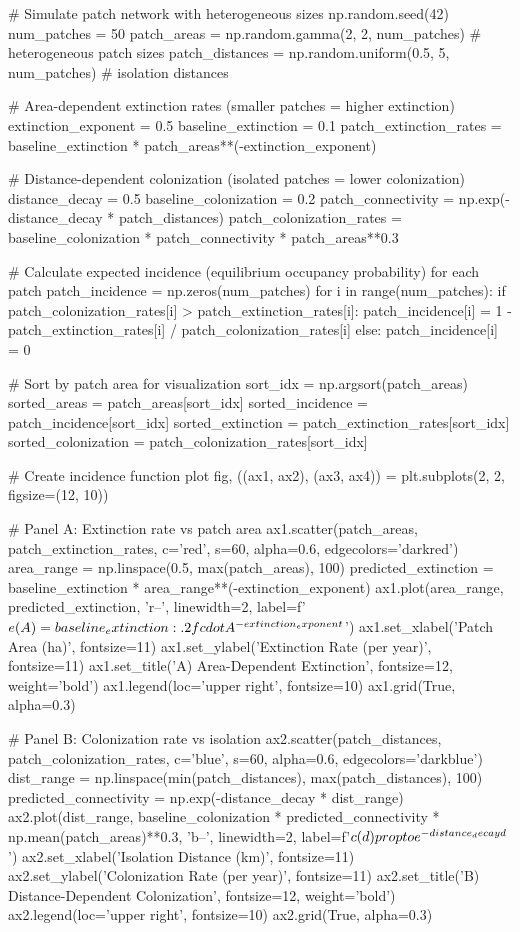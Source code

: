 \documentclass[11pt,a4paper]{article}
\begin{document}
\begin{pycode}
# Simulate patch network with heterogeneous sizes
np.random.seed(42)
num_patches = 50
patch_areas = np.random.gamma(2, 2, num_patches)  # heterogeneous patch sizes
patch_distances = np.random.uniform(0.5, 5, num_patches)  # isolation distances

# Area-dependent extinction rates (smaller patches = higher extinction)
extinction_exponent = 0.5
baseline_extinction = 0.1
patch_extinction_rates = baseline_extinction * patch_areas**(-extinction_exponent)

# Distance-dependent colonization (isolated patches = lower colonization)
distance_decay = 0.5
baseline_colonization = 0.2
patch_connectivity = np.exp(-distance_decay * patch_distances)
patch_colonization_rates = baseline_colonization * patch_connectivity * patch_areas**0.3

# Calculate expected incidence (equilibrium occupancy probability) for each patch
patch_incidence = np.zeros(num_patches)
for i in range(num_patches):
    if patch_colonization_rates[i] > patch_extinction_rates[i]:
        patch_incidence[i] = 1 - patch_extinction_rates[i] / patch_colonization_rates[i]
    else:
        patch_incidence[i] = 0

# Sort by patch area for visualization
sort_idx = np.argsort(patch_areas)
sorted_areas = patch_areas[sort_idx]
sorted_incidence = patch_incidence[sort_idx]
sorted_extinction = patch_extinction_rates[sort_idx]
sorted_colonization = patch_colonization_rates[sort_idx]

# Create incidence function plot
fig, ((ax1, ax2), (ax3, ax4)) = plt.subplots(2, 2, figsize=(12, 10))

# Panel A: Extinction rate vs patch area
ax1.scatter(patch_areas, patch_extinction_rates, c='red', s=60, alpha=0.6, edgecolors='darkred')
area_range = np.linspace(0.5, max(patch_areas), 100)
predicted_extinction = baseline_extinction * area_range**(-extinction_exponent)
ax1.plot(area_range, predicted_extinction, 'r--', linewidth=2,
        label=f'$e(A) = {baseline_extinction:.2f} \\cdot A^{{-{extinction_exponent}}}$')
ax1.set_xlabel('Patch Area (ha)', fontsize=11)
ax1.set_ylabel('Extinction Rate (per year)', fontsize=11)
ax1.set_title('A) Area-Dependent Extinction', fontsize=12, weight='bold')
ax1.legend(loc='upper right', fontsize=10)
ax1.grid(True, alpha=0.3)

# Panel B: Colonization rate vs isolation
ax2.scatter(patch_distances, patch_colonization_rates, c='blue', s=60, alpha=0.6, edgecolors='darkblue')
dist_range = np.linspace(min(patch_distances), max(patch_distances), 100)
predicted_connectivity = np.exp(-distance_decay * dist_range)
ax2.plot(dist_range, baseline_colonization * predicted_connectivity * np.mean(patch_areas)**0.3,
        'b--', linewidth=2, label=f'$c(d) \\propto e^{{-{distance_decay} d}}$')
ax2.set_xlabel('Isolation Distance (km)', fontsize=11)
ax2.set_ylabel('Colonization Rate (per year)', fontsize=11)
ax2.set_title('B) Distance-Dependent Colonization', fontsize=12, weight='bold')
ax2.legend(loc='upper right', fontsize=10)
ax2.grid(True, alpha=0.3)


\end{pycode}
\end{document}
